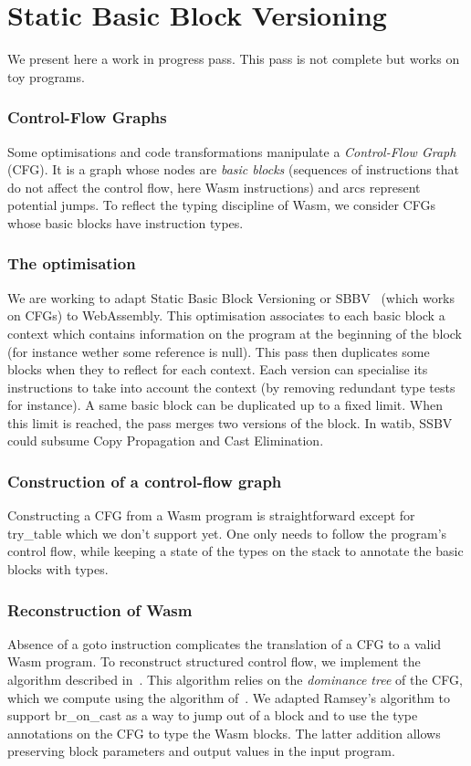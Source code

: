 \documentclass[a4paper,11pt]{article}
\begin{document}
\section{Static Basic Block Versioning}\label{sbbv}
We present here a work in progress pass. This pass is not complete but works on
toy programs.
\subsubsection{Control-Flow Graphs}\label{cfg}
Some optimisations and code transformations manipulate a \emph{Control-Flow
Graph} (CFG). It is a graph whose nodes are \emph{basic blocks} (sequences of
instructions that do not affect the control flow, here Wasm instructions) and
arcs represent potential jumps. To reflect the typing discipline of Wasm, we
consider CFGs whose basic blocks have instruction types.

\subsubsection{The optimisation}
We are working to adapt Static Basic Block Versioning or
SBBV~\cite{melanccon2024static} (which works on CFGs) to WebAssembly. This
optimisation associates to each basic block a context which contains information
on the program at the beginning of the block (for instance wether some reference
is null). This pass then duplicates some blocks when they to reflect for each
context. Each version can specialise its instructions to take into account the
context (by removing redundant type tests for instance). A same basic block can
be duplicated up to a fixed limit. When this limit is reached, the pass merges
two versions of the block. In \textsf{watib}, SSBV could subsume Copy
Propagation and Cast Elimination.

\subsubsection{Construction of a control-flow graph}
Constructing a CFG from a Wasm program is straightforward except for
\textsf{try\_table} which we don't support yet. One only needs to follow the
program's control flow, while keeping a state of the types on the stack to
annotate the basic blocks with types.

\subsubsection{Reconstruction of Wasm}
Absence of a goto instruction complicates the translation of a CFG to a valid
Wasm program. To reconstruct structured control flow, we implement the algorithm
described in~\cite{ramsey2022beyond}. This algorithm relies on the
\emph{dominance tree} of the CFG, which we compute using the algorithm
of~\cite{cooper2001simple}. We adapted Ramsey's algorithm to support
\textsf{br\_on\_cast} as a way to jump out of a block and to use the type
annotations on the CFG to type the Wasm blocks. The latter addition allows
preserving block parameters and output values in the input program.
\end{document}
